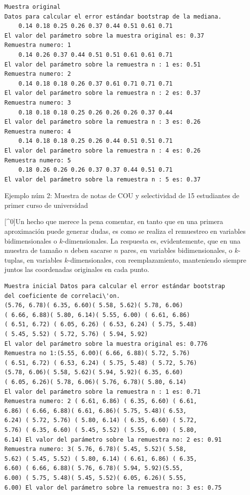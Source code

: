 \documentclass[
]{article}
\begin{document}
\begin{verbatim}
Muestra original
Datos para calcular el error estándar bootstrap de la mediana.
    0.14 0.18 0.25 0.26 0.37 0.44 0.51 0.61 0.71
El valor del parámetro sobre la muestra original es: 0.37
Remuestra numero: 1
    0.14 0.26 0.37 0.44 0.51 0.51 0.61 0.61 0.71
El valor del parámetro sobre la remuestra n : 1 es: 0.51
Remuestra numero: 2
    0.14 0.18 0.18 0.26 0.37 0.61 0.71 0.71 0.71
El valor del parámetro sobre la remuestra n : 2 es: 0.37
Remuestra numero: 3
    0.18 0.18 0.18 0.25 0.26 0.26 0.26 0.37 0.44
El valor del parámetro sobre la remuestra n : 3 es: 0.26
Remuestra numero: 4
    0.14 0.18 0.18 0.25 0.26 0.44 0.51 0.51 0.71
El valor del parámetro sobre la remuestra n : 4 es: 0.26
Remuestra numero: 5
    0.18 0.26 0.26 0.26 0.37 0.37 0.44 0.51 0.71
El valor del parámetro sobre la remuestra n : 5 es: 0.37
\end{verbatim}

Ejemplo núm 2: Muestra de notas de COU y selectividad de 15 estudiantes de primer curso de universidad

{[}\^{}0{]}Un hecho que merece la pena comentar, en tanto que en una primera aproximación puede generar dudas, es como se realiza el remuestreo en variables bidimensionales o \(k\)-dimensionales. La respuesta es, evidentemente, que en una muestra de tamaño \(n\) deben sacarse \(n\) pares, en variables bidimensionales, o \(k\)-tuplas, en variables \(k\)-dimensionales, con reemplazamiento, manteniendo siempre juntos las coordenadas originales en cada punto.

\begin{verbatim}
Muestra inicial Datos para calcular el error estándar bootstrap
del coeficiente de correlaci\'on.
(5.76, 6.78)( 6.35, 6.60)( 5.58, 5.62)( 5.78, 6.06)
( 6.66, 6.88)( 5.80, 6.14)( 5.55, 6.00) ( 6.61, 6.86)
( 6.51, 6.72) ( 6.05, 6.26) ( 6.53, 6.24) ( 5.75, 5.48)
( 5.45, 5.52) ( 5.72, 5.76) ( 5.94, 5.92)
El valor del parámetro sobre la muestra original es: 0.776
Remuestra no 1:(5.55, 6.00)( 6.66, 6.88)( 5.72, 5.76)
( 6.51, 6.72) ( 6.53, 6.24) ( 5.75, 5.48) ( 5.72, 5.76)
(5.78, 6.06)( 5.58, 5.62)( 5.94, 5.92)( 6.35, 6.60)
( 6.05, 6.26)( 5.78, 6.06)( 5.76, 6.78)( 5.80, 6.14)
El valor del parámetro sobre la remuestra n : 1 es: 0.71
Remuestra numero: 2 ( 6.61, 6.86) ( 6.35, 6.60) ( 6.61,
6.86) ( 6.66, 6.88)( 6.61, 6.86)( 5.75, 5.48)( 6.53,
6.24) ( 5.72, 5.76) ( 5.80, 6.14) ( 6.35, 6.60) ( 5.72,
5.76) ( 6.35, 6.60) ( 5.45, 5.52) ( 5.55, 6.00) ( 5.80,
6.14) El valor del parámetro sobre la remuestra no: 2 es: 0.91
Remuestra numero: 3( 5.76, 6.78)( 5.45, 5.52)( 5.58,
5.62) ( 5.45, 5.52) ( 5.80, 6.14) ( 6.61, 6.86) ( 6.35,
6.60) ( 6.66, 6.88)( 5.76, 6.78)( 5.94, 5.92)(5.55,
6.00) ( 5.75, 5.48)( 5.45, 5.52)( 6.05, 6.26)( 5.55,
6.00) El valor del parámetro sobre la remuestra no: 3 es: 0.75
\end{verbatim}
\end{document}
